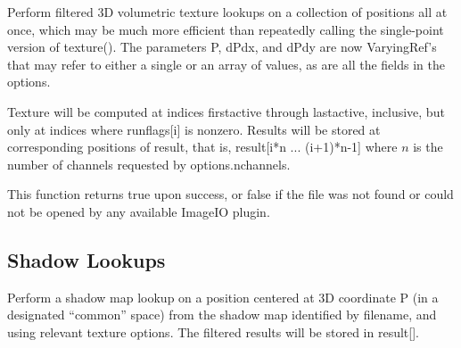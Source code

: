 \apiend


Perform filtered 3D volumetric texture lookups on a collection of positions all at
once, which may be much more efficient than repeatedly calling the
single-point version of {\cf texture()}.  The parameters {\cf P},
{\cf dPdx}, and {\cf dPdy} are now
{\cf VaryingRef}'s that may refer to either a single or an array of
values, as are all the fields in the {\cf options}.

Texture will be computed at indices {\cf firstactive} through
{\cf lastactive}, inclusive, but only at indices where {\cf runflags[i]}
is nonzero.  Results will be stored at corresponding positions of
{\cf result}, that is, {\cf result[i*n ... (i+1)*n-1]} where $n$ 
is the number of channels requested by {\cf options.nchannels}.

This function returns {\cf true} upon success, or {\cf false} if the
file was not found or could not be opened by any available ImageIO
plugin.
\apiend

\newpage
\subsection{Shadow Lookups}
\label{sec:texturesys:api:shadow}


Perform a shadow map lookup on a position centered at 3D
coordinate {\cf P} (in a designated ``common'' space) from the shadow map identified by
{\cf filename}, and using relevant texture {\cf options}.  The filtered
results will be stored in {\cf result[]}.

